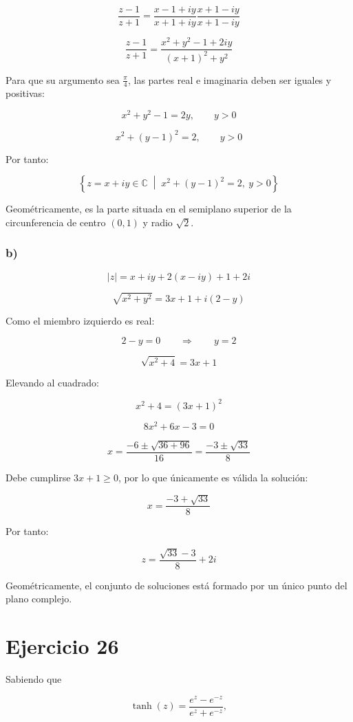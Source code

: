 \documentclass[fleqn]{article}
\begin{document}
		\[
		\frac{z-1}{z+1}
		=
		\frac{x-1+iy}{x+1+iy}
		\frac{x+1-iy}{x+1-iy}
		\]

		\[
		\frac{z-1}{z+1}
		=
		\frac{x^2+y^2-1+2iy}{(x+1)^2+y^2}
		\]

		Para que su argumento sea $\frac{\pi}{4}$, las partes real e imaginaria deben ser iguales y positivas:

		\[
		x^2+y^2-1=2y,
		\qquad y>0
		\]

		\[
		x^2+(y-1)^2=2,
		\qquad y>0
		\]

		Por tanto:

		\[
		\boxed{
		\left\{
		z=x+iy\in\mathbb{C}
		\;\middle|\;
		x^2+(y-1)^2=2,\ y>0
		\right\}
		}
		\]

		Geométricamente, es la parte situada en el semiplano superior de la circunferencia de centro $(0,1)$ y radio $\sqrt{2}$.

		\subsubsection*{b)}

		\[
		|z|
		=
		x+iy+2(x-iy)+1+2i
		\]

		\[
		\sqrt{x^2+y^2}
		=
		3x+1+i(2-y)
		\]

		Como el miembro izquierdo es real:

		\[
		2-y=0
		\qquad\Longrightarrow\qquad
		y=2
		\]

		\[
		\sqrt{x^2+4}=3x+1
		\]

		Elevando al cuadrado:

		\[
		x^2+4=(3x+1)^2
		\]

		\[
		8x^2+6x-3=0
		\]

		\[
		x
		=
		\frac{-6\pm\sqrt{36+96}}{16}
		=
		\frac{-3\pm\sqrt{33}}{8}
		\]

		Debe cumplirse $3x+1\geq 0$, por lo que únicamente es válida la solución:

		\[
		x=\frac{-3+\sqrt{33}}{8}
		\]

		Por tanto:

		\[
		\boxed{
		z=\frac{\sqrt{33}-3}{8}+2i
		}
		\]

		Geométricamente, el conjunto de soluciones está formado por un único punto del plano complejo.

	\section{Ejercicio 26}
		Sabiendo que

		\[
		\tanh(z)=\frac{e^z-e^{-z}}{e^z+e^{-z}},
		\]
\end{document}
